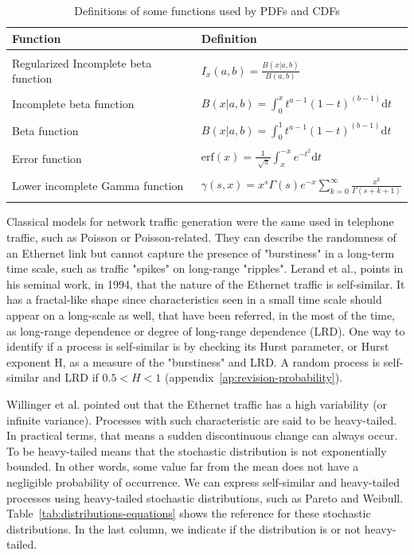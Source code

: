 \begin{table}[t!]
\centering
\caption{Definitions of some functions used by PDFs and CDFs}
\label{tab:distributions-definitions}
\begin{tabular}{ll}
\hline
Function                             & Definition \\ 
\hline
\\
Regularized Incomplete beta function & $ I_{x}(a, b) = \frac{B(x| a, b)}{B(a, b)} $           \\
\\
Incomplete beta function             & $ B(x| a, b) = \int_{0}^{x} t^{a - 1} (1 - t)^{(b - 1)} \text{d}t $           \\
\\
Beta function                        & $ B(x| a, b) = \int_{0}^{1} t^{a - 1} (1 - t)^{(b - 1)} \text{d}t $           \\
\\
Error function                       & $ \text{erf}(x) = \frac{1}{\sqrt[]{\pi}}\int_{x}^{-x} e^{-t^{2}} \text{d}t $           \\ 
\\
Lower incomplete Gamma function      & $ \gamma(s, x) = x^{s}\Gamma(s)e^{-x}\sum_{k = 0}^{\infty}\frac{x^{k}}{\Gamma(s+k+1)} $  \\
\\
\hline
\end{tabular}
\end{table}


Classical models for network traffic generation were the same used in telephone traffic, such as  Poisson or Poisson-related. They can describe the randomness of an Ethernet link but cannot capture the presence of "burstiness" in a long-term time scale, such as traffic "spikes" on long-range "ripples". Lerand et al.\cite{selfsimilar-ethernet}, points in his seminal work, in 1994, that the nature of the Ethernet traffic is self-similar. It has a fractal-like shape since characteristics seen in a small time scale should appear on a long-scale as well, that have been referred, in the most of the time, as long-range dependence or degree of long-range dependence (LRD). One way to identify if a process is self-similar is by checking its Hurst parameter, or Hurst exponent H, as a measure of the "burstiness" and LRD.  A random process is self-similar and LRD if $0.5 < H <1$\cite{stochastic-selfsimilar} (appendix~\ref{ap:revision-probability}). 

Willinger et al. pointed out that the Ethernet traffic has a high variability (or infinite variance)\cite{selfsimilar-highvariability}.  Processes with such characteristic are said to be heavy-tailed. In practical terms, that means a sudden discontinuous change can always occur. To be heavy-tailed means that the stochastic distribution is not exponentially bounded. In other words, some value far from the mean does not have a negligible probability of occurrence. We can express self-similar and heavy-tailed processes using heavy-tailed stochastic distributions, such as Pareto and Weibull. Table~\ref{tab:distributions-equations} shows the reference for these stochastic distributions. In the last column, we indicate if the distribution is or not heavy-tailed. 

